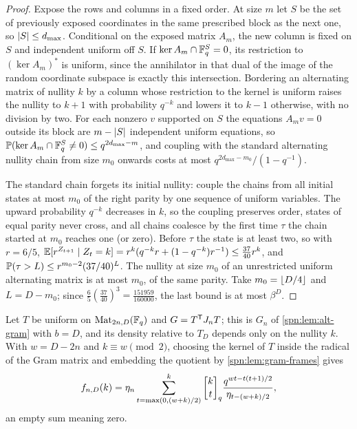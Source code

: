 \begin{proof}
Expose the rows and columns in a fixed order. At size $m$ let $S$ be the set of previously exposed
coordinates in the same prescribed block as the next one, so $\lvert S\rvert\le d_{\max}$. Conditional on
the exposed matrix $A_m$, the new column is fixed on $S$ and independent uniform off $S$. If
$\ker A_m\cap\mathbb{F}_q^S=0$, its restriction to $(\ker A_m)^*$ is uniform, since the annihilator in that
dual of the image of the random coordinate subspace is exactly this intersection. Bordering an
alternating matrix of nullity $k$ by a column whose restriction to the kernel is uniform raises the
nullity to $k+1$ with probability $q^{-k}$ and lowers it to $k-1$ otherwise, with no division by
two. For each nonzero $v$ supported on $S$ the equations $A_mv=0$ outside its block are
$m-\lvert S\rvert$ independent uniform equations, so $\mathbb{P}(\ker A_m\cap\mathbb{F}_q^S\ne0)\le q^{2d_{\max}-m}$, and
coupling with the standard alternating nullity chain from size $m_0$ onwards costs at most
$q^{2d_{\max}-m_0}/(1-q^{-1})$.

The standard chain forgets its initial nullity: couple the chains from all initial states at most
$m_0$ of the right parity by one sequence of uniform variables. The upward probability $q^{-k}$
decreases in $k$, so the coupling preserves order, states of equal parity never cross, and all
chains coalesce by the first time $\tau$ the chain started at $m_0$ reaches one (or zero). Before
$\tau$ the state is at least two, so with $r=6/5$,
$\mathbb{E}[r^{Z_{t+1}}\mid Z_t=k]=r^k(q^{-k}r+(1-q^{-k})r^{-1})\le\frac{37}{40}r^k$, and
$\mathbb{P}(\tau>L)\le r^{m_0-2}(37/40)^L$. The nullity at size $m_0$ of an unrestricted uniform
alternating matrix is at most $m_0$, of the same parity. Take $m_0=\lfloor D/4\rfloor$ and $L=D-m_0$; since
$\frac65(\frac{37}{40})^3=\frac{151959}{160000}$, the last bound is at most $\beta^D$.
\end{proof}

Let $T$ be uniform on $\operatorname{Mat}_{2n,D}(\mathbb{F}_q)$ and $G=T^{\mathsf{T}}J_nT$; this is $G_n$ of
\cref{spn:lem:alt-gram} with $b=D$, and its density relative to $T_D$ depends only on the nullity
$k$. With $w=D-2n$ and $k\equiv w\pmod 2$, choosing the kernel of $T$ inside the radical of the
Gram matrix and embedding the quotient by \cref{spn:lem:gram-frames} gives
\begin{equation}\label{spn:eq:unrestricted-gram}
 f_{n,D}(k)=\eta_n\sum_{t=\max(0,(w+k)/2)}^{k}\spnqbin ktq\frac{q^{wt-t(t+1)/2}}{\eta_{t-(w+k)/2}},
\end{equation}
an empty sum meaning zero.


